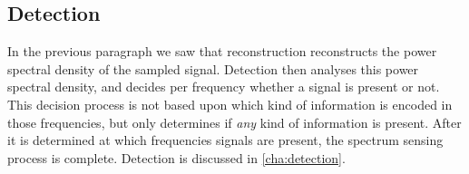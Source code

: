 \documentclass[a4paper, openany, oneside]{memoir}
\begin{document}
\subsection{Detection}
In the previous paragraph we saw that reconstruction reconstructs the power spectral density of the sampled signal. Detection then analyses this power spectral density, and decides per frequency whether a signal is present or not. This decision process is not based upon which kind of information is encoded in those frequencies, but only determines if \textit{any} kind of information is present. After it is determined at which frequencies signals are present, the spectrum sensing process is complete. Detection is discussed in \cref{cha:detection}.


\end{document}
